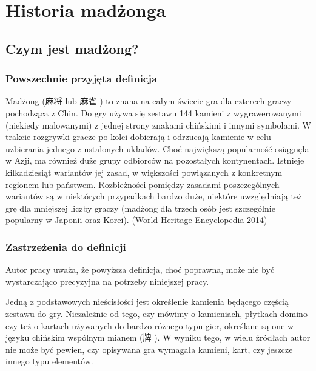 \chapter{Historia madżonga}
\section{Czym jest madżong?}
\subsection{Powszechnie przyjęta definicja}
Madżong (麻将  lub 麻雀 ) to znana na całym świecie
gra dla czterech graczy pochodząca z Chin. Do gry używa się zestawu 144 kamieni
z wygrawerowanymi (niekiedy malowanymi) z jednej strony znakami chińskimi i
innymi symbolami. W trakcie rozgrywki gracze po kolei dobierają i odrzucają
kamienie w celu uzbierania jednego z ustalonych układów. Choć największą
popularność osiągnęła w Azji, ma również duże grupy odbiorców na pozostałych
kontynentach.
Istnieje kilkadziesiąt wariantów jej zasad, w większości powiązanych z
konkretnym regionem lub państwem. Rozbieżności pomiędzy zasadami poszczególnych
wariantów są w niektórych przypadkach bardzo duże, niektóre uwzględniają też grę
dla mniejszej liczby graczy (madżong dla trzech osób jest szczególnie popularny
w Japonii oraz Korei). (World Heritage Encyclopedia 2014)
\subsection{Zastrzeżenia do definicji}
Autor pracy uważa, że powyższa definicja, choć poprawna, może nie być
wystarczająco precyzyjna na potrzeby niniejszej pracy.

Jedną z podstawowych nieścisłości jest określenie kamienia będącego częścią
zestawu do gry.
Niezależnie od tego, czy mówimy o kamieniach, płytkach domino czy też o kartach
używanych do bardzo różnego typu gier, określane są one w języku chińskim
wspólnym mianem  (牌 ). W wyniku tego, w wielu źródłach
autor nie może być pewien, czy opisywana gra wymagała kamieni, kart, czy jeszcze
innego typu elementów.

